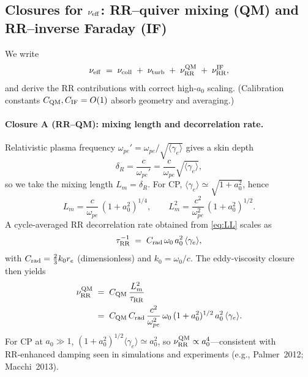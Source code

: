\documentclass[aps,pre,twocolumn,showpacs,superscriptaddress]{revtex4-2}
\theoremstyle{definition}
\begin{document}
\subsection{Closures for \texorpdfstring{$\nu_{\rm eff}$}{nu\_eff}: RR–quiver mixing (QM) and RR–inverse Faraday (IF)}\label{subsec:closures}

We write
\begin{equation}\label{eq:nuEffUnified}
\nu_{\rm eff} \;=\; \nu_{\rm coll} \;+\; \nu_{\rm turb} \;+\; \nu_{\rm RR}^{\rm QM} \;+\; \nu_{\rm RR}^{\rm IF},
\end{equation}
and derive the RR contributions with correct high‑$a_0$ scaling. (Calibration constants $C_{\rm QM},C_{\rm IF}=O(1)$ absorb geometry and averaging.)

\paragraph{Closure A (RR–QM): mixing length and decorrelation rate.}
Relativistic plasma frequency $\omega_{pe}'=\omega_{pe}/\sqrt{\langle\gamma_e\rangle}$ gives a skin depth
\begin{equation}\label{eq:deltaR}
\delta_R=\frac{c}{\omega_{pe}'}=\frac{c}{\omega_{pe}}\sqrt{\langle\gamma_e\rangle},
\end{equation}
so we take the mixing length $L_m=\delta_R$. For CP, $\langle\gamma_e\rangle\simeq \sqrt{1+a_0^2}$, hence
\begin{equation}\label{eq:Lm}
L_m=\frac{c}{\omega_{pe}}\,(1+a_0^2)^{1/4},\qquad L_m^2=\frac{c^2}{\omega_{pe}^2}\,(1+a_0^2)^{1/2}.
\end{equation}
A cycle‑averaged RR decorrelation rate obtained from \eqref{eq:LL} scales as
\begin{equation}\label{eq:tauRR}
\tau_{\rm RR}^{-1} \;=\; C_{\rm rad}\,\omega_0\,a_0^2\,\langle\gamma_e\rangle,
\end{equation}
with $C_{\rm rad}=\tfrac{2}{3}k_0 r_e$ (dimensionless) and $k_0=\omega_0/c$. The eddy‑viscosity closure then yields
\begin{align}\label{eq:nuRRQM}
\nu_{\rm RR}^{\rm QM} &\;=\; C_{\rm QM}\,\frac{L_m^2}{\tau_{\rm RR}}\nonumber\\
&\;=\; C_{\rm QM}\,C_{\rm rad}\,\frac{c^2}{\omega_{pe}^2}\,\omega_0\,(1+a_0^2)^{1/2}\,a_0^2\,\langle\gamma_e\rangle.
\end{align}
For CP at $a_0\gg 1$, $(1+a_0^2)^{1/2}\langle\gamma_e\rangle\simeq a_0^2$, so $\nu_{\rm RR}^{\rm QM}\propto a_0^4$—consistent with RR‑enhanced damping seen in simulations and experiments (e.g., Palmer~2012; Macchi~2013).
\end{document}
